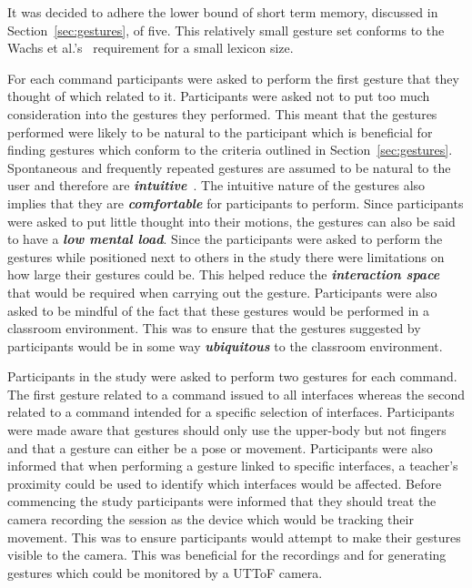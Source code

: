 \documentclass[manuscript, review, screen]{acmart}
\begin{document}
It was decided to adhere the lower bound of short term memory, discussed in Section~\ref{sec:gestures}, of five.
This relatively small gesture set conforms to the Wachs et al.'s~\citeyearpar{Wachs2011} requirement for a small lexicon size.

For each command participants were asked to perform the first gesture that they thought of which related to it.
Participants were asked not to put too much consideration into the gestures they performed.
This meant that the gestures performed were likely to be natural to the participant which is beneficial for finding gestures which conform to the criteria outlined in Section~\ref{sec:gestures}.
Spontaneous and frequently repeated gestures are assumed to be natural to the user and therefore are \textit{\textbf{intuitive}}~\cite{Grandhi2011}.
The intuitive nature of the gestures also implies that they are \textit{\textbf{comfortable}} for participants to perform.
Since participants were asked to put little thought into their motions, the gestures can also be said to have a \textit{\textbf{low mental load}}.
Since the participants were asked to perform the gestures while positioned next to others in the study there were limitations on how large their gestures could be.
This helped reduce the \textit{\textbf{interaction space}} that would be required when carrying out the gesture.
Participants were also asked to be mindful of the fact that these gestures would be performed in a classroom environment.
This was to ensure that the gestures suggested by participants would be in some way \textit{\textbf{ubiquitous}} to the classroom environment.

Participants in the study were asked to perform two gestures for each command.
The first gesture related to a command issued to all interfaces whereas the second related to a command intended for a specific selection of interfaces.
Participants were made aware that gestures should only use the upper-body but not fingers and that a gesture can either be a pose or movement.
Participants were also informed that when performing a gesture linked to specific interfaces, a teacher's proximity could be used to identify which interfaces would be affected.
Before commencing the study participants were informed that they should treat the camera recording the session as the device which would be tracking their movement.
This was to ensure participants would attempt to make their gestures visible to the camera.
This was beneficial for the recordings and for generating gestures which could be monitored by a \ac{UTToF} camera.
\end{document}
